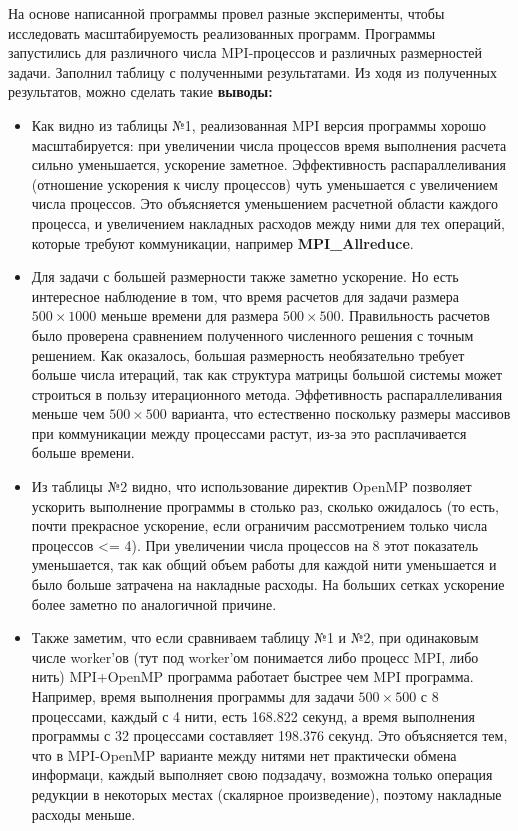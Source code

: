 \documentclass{article}
\begin{document}
На основе написанной программы провел разные эксперименты, чтобы исследовать масштабируемость реализованных программ. Программы запустились для различного числа MPI-процессов и различных размерностей задачи. Заполнил таблицу с полученными результатами. Из ходя из полученных результатов, можно сделать такие \textbf{выводы:}
\begin{itemize}
    \item Как видно из таблицы №1, реализованная MPI версия программы хорошо масштабируется: при увеличении числа процессов время выполнения расчета сильно уменьшается, ускорение заметное. Эффективность распараллеливания (отношение ускорения к числу процессов) чуть уменьшается с увеличением числа процессов. Это объясняется уменьшением расчетной области каждого процесса, и увеличением накладных расходов между ними для тех операций, которые требуют коммуникации, например \textbf{MPI\_Allreduce}. 
    \item Для задачи с большей размерности также заметно ускорение. Но есть интересное наблюдение в том, что время расчетов для задачи размера $500\times 1000$ меньше времени для размера $500\times 500$. Правильность расчетов было проверена сравнением полученного численного решения с точным решением. Как оказалось, большая размерность необязательно требует больше числа итераций, так как структура матрицы большой системы может строиться в пользу итерационного метода. Эффетивность распараллеливания меньше чем $500\times 500$ варианта, что естественно поскольку размеры массивов при коммуникации между процессами растут, из-за это расплачивается больше времени.
    \item Из таблицы №2 видно, что использование директив OpenMP позволяет ускорить выполнение программы в столько раз, сколько ожидалось (то есть, почти прекрасное ускорение, если ограничим рассмотрением только числа процессов <= 4). При увеличении числа процессов на $8$ этот показатель уменьшается, так как общий объем работы для каждой нити уменьшается и было больше затрачена на накладные расходы. На больших сетках ускорение более заметно по аналогичной причине.
    \item Также заметим, что если сравниваем таблицу №1 и №2, при одинаковым числе worker'ов (тут под worker'ом понимается либо процесс MPI, либо нить) MPI+OpenMP программа работает быстрее чем MPI программа. Например, время выполнения программы для задачи $500\times 500$ с 8 процессами, каждый с 4 нити, есть 168.822 секунд, а время выполнения программы с 32 процессами составляет 198.376 секунд. Это объясняется тем, что в MPI-OpenMP варианте между нитями нет практически обмена информаци, каждый выполняет свою подзадачу, возможна только операция редукции в некоторых местах (скалярное произведение), поэтому накладные расходы меньше.

\end{itemize}
\end{document}
